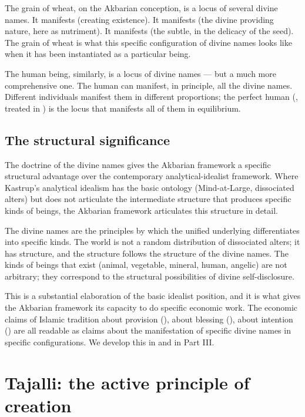 The grain of wheat, on the Akbarian conception, is a locus of
several divine names. It manifests  (creating
existence). It manifests  (the divine providing
nature, here as nutriment). It manifests  (the
subtle, in the delicacy of the seed). The grain of wheat is what
this specific configuration of divine names looks like when it has
been instantiated as a particular being.

The human being, similarly, is a locus of divine names --- but a
much more comprehensive one. The human can manifest, in principle,
all the divine names. Different individuals manifest them in
different proportions; the perfect human (,
treated in ) is the locus that manifests
all of them in equilibrium.

\subsection{The structural significance}

The doctrine of the divine names gives the Akbarian framework a
specific structural advantage over the contemporary
analytical-idealist framework. Where Kastrup's analytical idealism
has the basic ontology (Mind-at-Large, dissociated alters) but does
not articulate the intermediate structure that produces specific
kinds of beings, the Akbarian framework articulates this structure
in detail.

The divine names are the principles by which the unified underlying
 differentiates into specific kinds. The world is not a
random distribution of dissociated alters; it has structure, and
the structure follows the structure of the divine names. The kinds
of beings that exist (animal, vegetable, mineral, human, angelic)
are not arbitrary; they correspond to the structural possibilities
of divine self-disclosure.

This is a substantial elaboration of the basic idealist position,
and it is what gives the Akbarian framework its capacity to do
specific economic work. The economic claims of Islamic tradition
about provision (), about blessing (), about
intention () are all readable as claims about the
manifestation of specific divine names in specific configurations.
We develop this in  and in Part III.

\section{Tajalli: the active principle of creation}
\label{sec:tajalli-mechanism}

